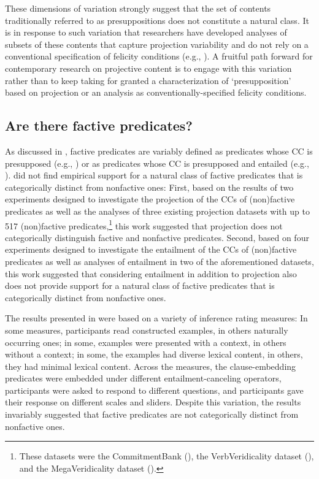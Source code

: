 \documentclass[11pt,fleqn]{article}
\newcommand{\6}{\mbox{$[\hspace*{-.6mm}[$}}
\newcommand{\9}{\mbox{$]\hspace*{-.6mm}]$}}
\begin{document}
These dimensions of variation strongly suggest that the set of contents traditionally referred to as presuppositions does not constitute a natural class. It is in response to such variation that researchers have developed analyses of subsets of these contents that capture projection variability and do not rely on a conventional specification of felicity conditions (e.g., \citealt{abrusan2011,abrusan2013,abrusan2016,abusch02,abusch10,romoli2015}). A fruitful path forward for contemporary research on projective content is to engage with this variation rather than to keep taking for granted a characterization of `presupposition'  based on projection or an analysis as conventionally-specified felicity conditions.

\subsection{Are there factive predicates?}

As discussed in \citealt{degen-tonhauser-language}, factive predicates are variably defined as predicates whose CC is presupposed (e.g., \citealt{kiparsky-kiparsky70}) or as predicates whose CC is presupposed and entailed (e.g., \citealt{gazdar79a,schlenker10,abrusan2011}). \citealt{degen-tonhauser-language} did not find empirical support for a natural class of factive predicates that is categorically distinct from nonfactive ones: First, based on the results of two experiments designed to investigate the projection of the CCs of (non)factive predicates as well as the analyses of three existing projection datasets with up to 517 (non)factive predicates,\footnote{These datasets were the CommitmentBank (\citealt{demarneffe-etal-sub23}), the VerbVeridicality dataset (\citealt{ross-pavlick2019}), and the MegaVeridicality dataset (\citealt{white-rawlins-nels2018}).} this work suggested that projection does not categorically distinguish factive and nonfactive predicates. Second, based on four experiments designed to investigate the entailment of the CCs of (non)factive predicates as well as analyses of entailment in two of the aforementioned datasets, this work suggested that considering entailment in addition to projection also does not provide support for a natural class of factive predicates that is categorically distinct from nonfactive ones. 

The results presented in \citealt{degen-tonhauser-language} were based on a variety of inference rating measures: In some measures, participants read constructed examples, in others naturally occurring ones; in some, examples were presented with a context, in others without a context; in some, the examples had diverse lexical content, in others, they had minimal lexical content. Across the measures, the clause-embedding predicates were embedded under different entailment-canceling operators, participants were asked to respond to different questions, and participants gave their response on different scales and sliders. Despite this variation, the results invariably suggested that factive predicates are not categorically distinct from nonfactive ones. 
\end{document}
